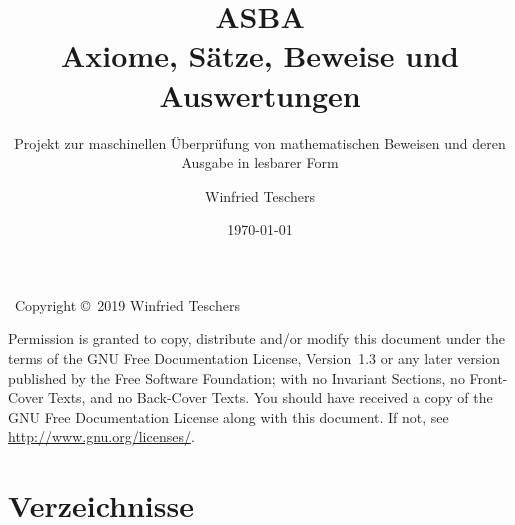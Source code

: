 \titlehead{
	{\Large Dr. Winfried Teschers}\\
	Anton-Günther-Straße 26c\\91083 Baiersdorf\\
	{\footnotesize winfried.teschers@t-online.de}
}
\subject{Projektdokument}
\title{{\Huge ASBA}\\Axiome, Sätze, Beweise und Auswertungen}
\subtitle{Projekt zur maschinellen Überprüfung von mathematischen Beweisen und deren Ausgabe in lesbarer Form}
\author{Winfried Teschers}
\date{\today}
\publishers{\vspace{1cm}\normalsize
	Es wird ein Programmsystem beschrieben, das zu eingegebenen Axiomen, Sätzen und Beweisen letztere prüft, Auswertungen generiert und unter Zuhilfenahme gegebener Ausgabeschemata eine Ausgabe im \LaTeX-Format mit Formeln in mathematisch üblicher Schreibweise erstellt.
}



	\maketitle
	~\vfill Copyright \copyright\ 2019 Winfried Teschers\bigskip

	\begin{otherlanguage}{english}
		Permission is granted to copy, distribute and/or modify this document under the terms of the GNU Free Documentation License, Version~1.3 or any later version published by the Free Software Foundation; with no Invariant Sections, no Front-Cover Texts, and no Back-Cover Texts.
		You should have received a copy of the GNU Free Documentation License along with this document.
		If not, see \url{http://www.gnu.org/licenses/}.
	\end{otherlanguage}

	\tableofcontents
	\Endchapter

	
	
	
	
	\iftestFlg       %
		\begin{offen}%
			
		\end{offen}  %
	\else\fi         %
	
	

	\chapter     {Verzeichnisse}%
	\label   {app-Verzeichnisse}

